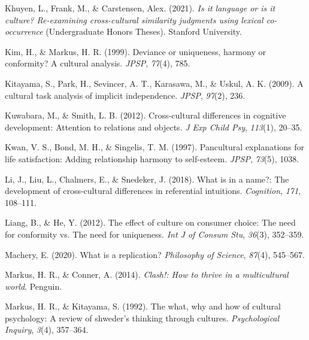 \documentclass[
  man]{apa6}
\newlength{\cslhangindent}
\newlength{\cslentryspacingunit} %
\newenvironment{CSLReferences}[2] %
 {%
  \setlength{\parindent}{0pt}
  \ifodd #1
  \let\oldpar\par
  \def\par{\hangindent=\cslhangindent\oldpar}
  \fi
  \setlength{\parskip}{#2\cslentryspacingunit}
 }%
 {}
\begin{document}
\begin{CSLReferences}{1}{0}
\leavevmode{}%
Khuyen, L., Frank, M., \& Carstensen, Alex. (2021). \emph{Is it language or is it culture? Re-examining cross-cultural similarity judgments using lexical co-occurrence} (Undergraduate Honors Theses). Stanford University.

\leavevmode{}%
Kim, H., \& Markus, H. R. (1999). Deviance or uniqueness, harmony or conformity? A cultural analysis. \emph{JPSP}, \emph{77}(4), 785.

\leavevmode{}%
Kitayama, S., Park, H., Sevincer, A. T., Karasawa, M., \& Uskul, A. K. (2009). A cultural task analysis of implicit independence. \emph{JPSP}, \emph{97}(2), 236.

\leavevmode{}%
Kuwabara, M., \& Smith, L. B. (2012). Cross-cultural differences in cognitive development: Attention to relations and objects. \emph{J Exp Child Psy}, \emph{113}(1), 20--35.

\leavevmode{}%
Kwan, V. S., Bond, M. H., \& Singelis, T. M. (1997). Pancultural explanations for life satisfaction: Adding relationship harmony to self-esteem. \emph{JPSP}, \emph{73}(5), 1038.

\leavevmode{}%
Li, J., Liu, L., Chalmers, E., \& Snedeker, J. (2018). What is in a name?: The development of cross-cultural differences in referential intuitions. \emph{Cognition}, \emph{171}, 108--111.

\leavevmode{}%
Liang, B., \& He, Y. (2012). The effect of culture on consumer choice: The need for conformity vs. The need for uniqueness. \emph{Int J of Consum Stu}, \emph{36}(3), 352--359.

\leavevmode{}%
Machery, E. (2020). What is a replication? \emph{Philosophy of Science}, \emph{87}(4), 545--567.

\leavevmode{}%
Markus, H. R., \& Conner, A. (2014). \emph{Clash!: How to thrive in a multicultural world}. Penguin.

\leavevmode{}%
Markus, H. R., \& Kitayama, S. (1992). The what, why and how of cultural psychology: A review of shweder's thinking through cultures. \emph{Psychological Inquiry}, \emph{3}(4), 357--364.


\end{CSLReferences}
\end{document}
